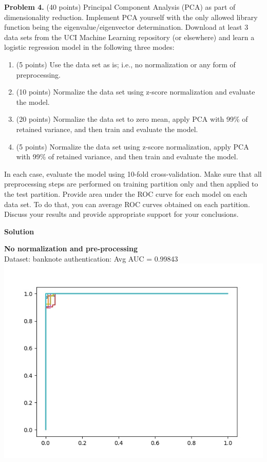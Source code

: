 \documentclass[twoside]{article}
\begin{document}
\newpage
\textbf{Problem 4.} (40 points) Principal Component Analysis (PCA) as part of dimensionality reduction. Implement PCA yourself with the only allowed library function being the eigenvalue/eigenvector determination. Download at least 3 data sets from the UCI Machine Learning repository (or elsewhere) and learn a logistic regression model in the following three modes:

\begin{enumerate}
\item (5 points) Use the data set as is; i.e., no normalization or any form of preprocessing.
\item (10 points) Normalize the data set using z-score normalization and evaluate the model.
\item (20 points) Normalize the data set to zero mean, apply PCA with 99\% of retained variance, and then train and evaluate the model.
\item (5 points) Normalize the data set using z-score normalization, apply PCA with 99\% of retained variance, and then train and evaluate the model.
\end{enumerate}
In each case, evaluate the model using 10-fold cross-validation. Make sure that all preprocessing steps are performed on training partition only and then applied to the test partition. Provide area under the ROC curve for each model on each data set. To do that, you can average ROC curves obtained on each partition. Discuss your results and provide appropriate support for your conclusions.

\vspace{1em}

\textbf{Solution}

\textbf{No normalization and pre-processing}\\
Dataset: banknote authentication: Avg AUC = 0.99843\\
\includegraphics[scale=0.4]{Plots/Banknote.jpg}
\end{document}
